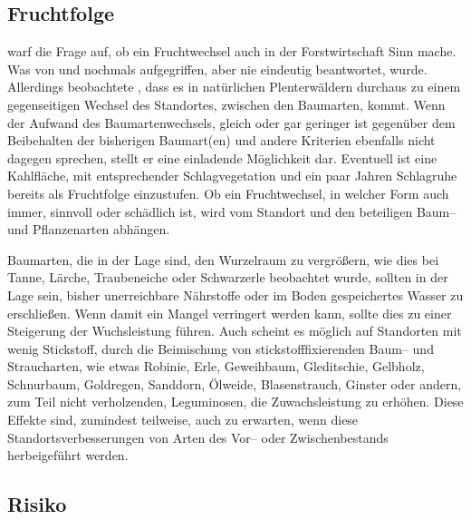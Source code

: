 \documentclass[twocolumn]{scrartcl}
\begin{document}
\subsection{Fruchtfolge}
\label{ssec:Fruchtfolge}

\cite{jentsch1911fruchtwechsel} warf die Frage auf, ob ein Fruchtwechsel auch in
der Forstwirtschaft Sinn mache. Was von \cite{sieber1919Holzartenwechsel} und
\cite{fabricius1924Holzartenwechsel} nochmals aufgegriffen, aber nie eindeutig
beantwortet, wurde. Allerdings beobachtete \cite{simak1951Baumartenwechsel},
dass es in natürlichen Plenterwäldern durchaus zu einem gegenseitigen Wechsel
des Standortes, zwischen den Baumarten, kommt. Wenn der Aufwand des
Baumartenwechsels, gleich oder gar geringer ist gegenüber dem Beibehalten der
bisherigen Baumart(en) und andere Kriterien ebenfalls nicht dagegen sprechen,
stellt er eine einladende Möglichkeit dar. Eventuell ist eine
\glqq{}Kahlfläche\grqq{}, mit entsprechender Schlagvegetation und ein paar
Jahren Schlagruhe bereits als Fruchtfolge einzustufen. Ob ein Fruchtwechsel, in
welcher Form auch immer, sinnvoll oder schädlich ist, wird vom Standort und den
beteiligen Baum-- und Pflanzenarten abhängen.

Baumarten, die in der Lage sind, den Wurzelraum zu vergrößern, wie dies
bei Tanne, Lärche, Traubeneiche oder Schwarzerle \cite[S.~114, 130,
150, 180]{koestler1969WurzelnDerWaldbaeume} beobachtet wurde, sollten
in der Lage sein, bisher unerreichbare Nährstoffe oder im Boden
gespeichertes Wasser zu erschließen. Wenn damit ein Mangel verringert werden kann, sollte dies zu einer Steigerung der Wuchsleistung führen.
Auch scheint es möglich auf Standorten mit wenig Stickstoff,
durch die Beimischung von stickstofffixierenden Baum-- und
Straucharten, wie etwas Robinie, Erle, Geweihbaum, Gleditschie,
Gelbholz, Schnurbaum, Goldregen, Sanddorn, Ölweide, Blasenstrauch,
Ginster oder andern, zum Teil nicht verholzenden, Leguminosen, die
Zuwachsleistung zu erhöhen. Diese Effekte sind, zumindest teilweise,
auch zu erwarten, wenn diese Standortsverbesserungen von Arten des Vor-- oder Zwischenbestands herbeigeführt werden.

\subsection{Risiko}
\label{ssec:risiko}
\end{document}
